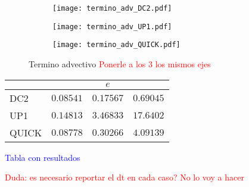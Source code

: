 \documentclass[aps,prb,twocolumn,superscriptaddress,floatfix,longbibliography,10pt]{revtex4-2}
\begin{document}
\begin{figure}
  \centering
  \begin{subfigure}[b]{0.32\textwidth}
      \centering
      \texttt{[image: termino\_adv\_DC2.pdf]}
      \caption{}
      \label{fig:termino_adv_DC2}
  \end{subfigure}
  \hfill
  \begin{subfigure}[b]{0.32\textwidth}
      \centering
      \texttt{[image: termino\_adv\_UP1.pdf]}
      \caption{}
      \label{fig:termino_adv_UP1}
  \end{subfigure}
  \hfill
  \begin{subfigure}[b]{0.32\textwidth}
      \centering
      \texttt{[image: termino\_adv\_QUICK.pdf]}
      \caption{}
      \label{fig:termino_adv_QUICK}
  \end{subfigure}
     \caption{Termino advectivo \textcolor{red}{Ponerle a los 3 los mismos ejes}}
     \label{fig:termino_advectivo}
\end{figure}



\twocolumngrid




\begin{table}[]
  \begin{tabular}{l|ccc|}
  \cline{2-4}
                            & \multicolumn{3}{c|}{$e$}                                                    \\ \hline
  \multicolumn{1}{|l|}{DC2} & \multicolumn{1}{c|}{$0.08541$} & \multicolumn{1}{c|}{$0.17567$} & $0.69045$ \\ \hline
  \multicolumn{1}{|l|}{UP1} & \multicolumn{1}{c|}{$0.14813$} & \multicolumn{1}{c|}{$3.46833$} & $17.6402$ \\ \hline
  \multicolumn{1}{|l|}{QUICK} & \multicolumn{1}{c|}{$0.08778$} & \multicolumn{1}{c|}{$0.30266$} & $4.09139$ \\ \hline
  \end{tabular}
  \end{table}

\textcolor{blue}{Tabla con resultados}



\textcolor{red}{Duda: es necesario reportar el dt en cada caso? No lo voy a hacer}
\end{document}
